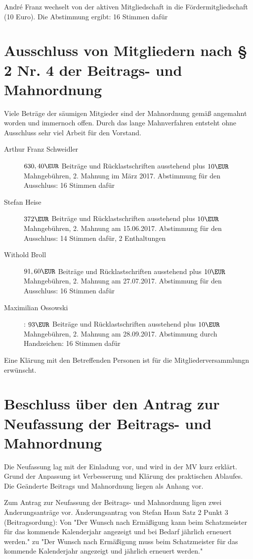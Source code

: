 \documentclass[a4paper,12pt,titlepage]{scrartcl}
\begin{document}
André Franz wechselt von der aktiven Mitgliedschaft in die Fördermitgliedschaft (10 Euro). Die Abstimmung ergibt: 16 Stimmen dafür

\section{ Ausschluss von Mitgliedern nach § 2 Nr. 4 der Beitrags- und Mahnordnung }

Viele Beträge der säumigen Mitgieder sind der Mahnordnung gemäß angemahnt worden und immernoch offen. Durch das lange Mahnverfahren entsteht ohne Ausschluss sehr viel Arbeit für den Vorstand.

\begin{description}

\item[Arthur Franz Schweidler] $630,40\EUR$ Beiträge und Rücklastschriften ausstehend plus $10\EUR$ Mahngebühren, 2. Mahnung im März 2017. Abstimmung für den Ausschluss: 16 Stimmen dafür
\item[Stefan Heise] $372\EUR$ Beiträge und Rücklastschriften ausstehend plus $10\EUR$ Mahngebühren, 2. Mahnung am 15.06.2017. Abstimmung für den Ausschluss: 14 Stimmen dafür, 2 Enthaltungen
\item[Withold Broll] $91,60\EUR$ Beiträge und Rücklastschriften ausstehend plus $10\EUR$ Mahngebühren, 2. Mahnung am 27.07.2017. Abstimmung für den Ausschluss: 16 Stimmen dafür
\item[Maximilian Ossowski]: $93\EUR$ Beiträge und Rücklastschriften ausstehend plus $10\EUR$ Mahngebühren, 2. Mahnung am 28.09.2017. Abstimmung durch Handzeichen: 16 Stimmen dafür
\end{description}

Eine Klärung mit den Betreffenden Personen ist für die Mitgliederversammlungn erwünscht.


\section{Beschluss über den Antrag zur Neufassung der Beitrags- und Mahnordnung}

Die Neufassung lag mit der Einladung vor, und wird in der MV kurz erklärt. Grund der Anpassung ist Verbesserung und Klärung des praktischen Ablaufes. Die Geänderte Beitrags und Mahnordnung liegen als Anhang vor.
 
Zum Antrag zur Neufassung der Beitrags- und Mahnordnung ligen zwei Änderungsanträge vor.
Änderungsantrag von Stefan Haun Satz 2 Punkt 3 (Beitragsordung): Von 
"Der Wunsch nach Ermäßigung kann beim Schatzmeister für das
kommende Kalenderjahr angezeigt und bei Bedarf jährlich erneuert werden." zu 
"Der Wunsch nach Ermäßigung muss beim Schatzmeister für das
kommende Kalenderjahr angezeigt und jährlich erneuert werden."
\end{document}
